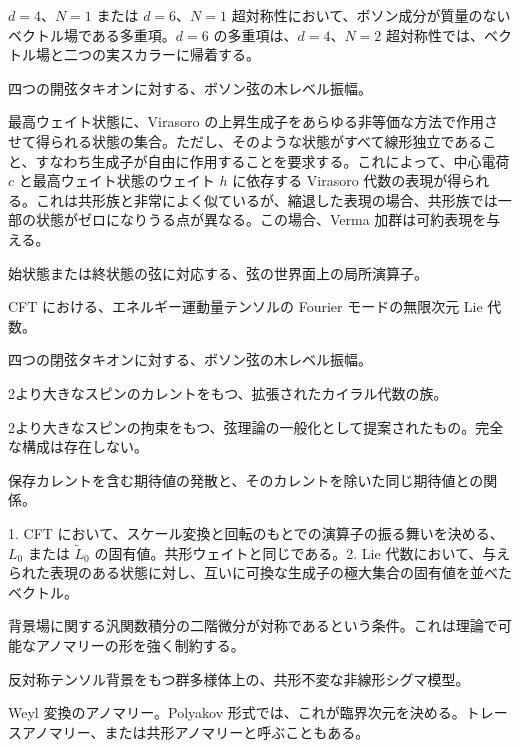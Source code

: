 {$d=4$、$N=1$ または $d=6$、$N=1$ 超対称性において、ボソン成分が質量のないベクトル場である多重項。$d=6$ の多重項は、$d=4$、$N=2$ 超対称性では、ベクトル場と二つの実スカラーに帰着する。}

{四つの開弦タキオンに対する、ボソン弦の木レベル振幅。}

{最高ウェイト状態に、Virasoro の上昇生成子をあらゆる非等価な方法で作用させて得られる状態の集合。ただし、そのような状態がすべて線形独立であること、すなわち生成子が自由に作用することを要求する。これによって、中心電荷 $c$ と最高ウェイト状態のウェイト $h$ に依存する Virasoro 代数の表現が得られる。これは共形族と非常によく似ているが、縮退した表現の場合、共形族では一部の状態がゼロになりうる点が異なる。この場合、Verma 加群は可約表現を与える。}

{始状態または終状態の弦に対応する、弦の世界面上の局所演算子。}

{CFT における、エネルギー運動量テンソルの Fourier モードの無限次元 Lie 代数。}

{四つの閉弦タキオンに対する、ボソン弦の木レベル振幅。}

{2より大きなスピンのカレントをもつ、拡張されたカイラル代数の族。}

{2より大きなスピンの拘束をもつ、弦理論の一般化として提案されたもの。完全な構成は存在しない。}

{保存カレントを含む期待値の発散と、そのカレントを除いた同じ期待値との関係。}

{1. CFT において、スケール変換と回転のもとでの演算子の振る舞いを決める、$L_0$ または $\widetilde L_0$ の固有値。共形ウェイトと同じである。2. Lie 代数において、与えられた表現のある状態に対し、互いに可換な生成子の極大集合の固有値を並べたベクトル。}

{背景場に関する汎関数積分の二階微分が対称であるという条件。これは理論で可能なアノマリーの形を強く制約する。}

{反対称テンソル背景をもつ群多様体上の、共形不変な非線形シグマ模型。}

{Weyl 変換のアノマリー。Polyakov 形式では、これが臨界次元を決める。トレースアノマリー、または共形アノマリーと呼ぶこともある。}

